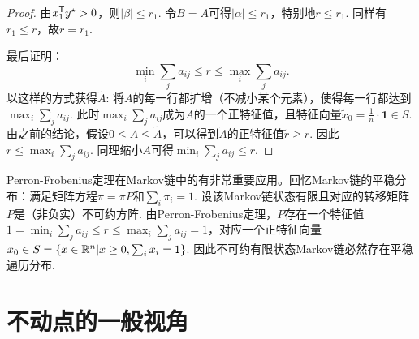 \begin{proof}
由$x_1^{\mathsf{T}} y^\star>0$，则$|\beta|\le r_1$. 令$B=A$可得$|\alpha|\le r_1$，特别地$r\le r_1$. 同样有$r_1\le r$，故$r=r_1$. 

最后证明：
\[\min_i\sum_j a_{ij}\le r\le \max_i\sum_j a_{ij}.\]
以这样的方式获得$\tilde A$: 将$A$的每一行都扩增（不减小某个元素），使得每一行都达到$\max_i\sum_j a_{ij}$. 此时$\max_i\sum_j a_{ij}$成为$A$的一个正特征值，且特征向量$\tilde{x}_0=\frac 1n\cdot\mathbf{1}\in S$. 由之前的结论，假设$0\le A\le \tilde A$，可以得到$\tilde A$的正特征值$\tilde r\ge r$. 因此$r \le \max_i\sum_j a_{ij}$. 同理缩小$A$可得$\min_i\sum_j a_{ij}\le r$.
\end{proof}

Perron-Frobenius定理在Markov链中的有非常重要应用。回忆Markov链的平稳分布：满足矩阵方程$\pi = \pi P$和$\sum_i\pi_i=1$.  设该Markov链状态有限且对应的转移矩阵$P$是（非负实）不可约方阵. 由Perron-Frobenius定理，$P$存在一个特征值$1=\min_i\sum_ja_{ij}\le r\le\max_i\sum_j a_{ij}=1$，对应一个正特征向量$x_0\in S=\{x\in\mathbb{R}^n|x\ge 0,\sum_ix_i=1\}$. 因此不可约有限状态Markov链必然存在平稳遍历分布.


\section{不动点的一般视角}
    